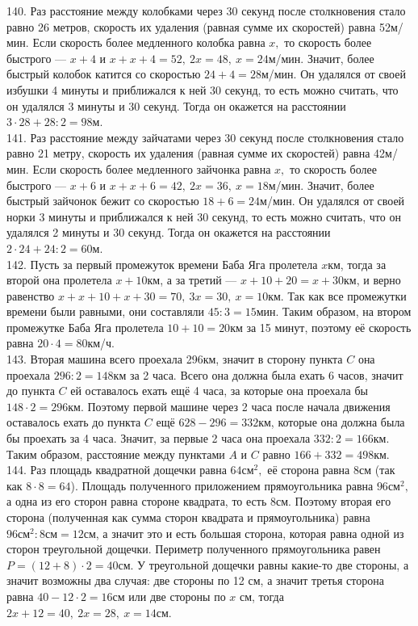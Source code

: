 140. Раз расстояние между колобками через 30 секунд после столкновения стало равно 26 метров, скорость их удаления (равная сумме их скоростей) равна 52м/мин. Если скорость более медленного колобка равна $x,$ то скорость более быстрого --- $x+4$ и $x+x+4=52,\ 2x=48,\ x=24$м/мин. Значит, более быстрый колобок катится со скоростью $24+4=28$м/мин. Он удалялся от своей избушки 4 минуты и приближался к ней 30 секунд, то есть можно считать, что он удалялся 3 минуты и 30 секунд. Тогда он окажется на расстоянии $3\cdot28+28:2=98$м.\\
141. Раз расстояние между зайчатами через 30 секунд после столкновения стало равно 21 метру, скорость их удаления (равная сумме их скоростей) равна 42м/мин. Если скорость более медленного зайчонка равна $x,$ то скорость более быстрого --- $x+6$ и $x+x+6=42,\ 2x=36,\ x=18$м/мин. Значит, более быстрый зайчонок бежит со скоростью $18+6=24$м/мин. Он удалялся от своей норки 3 минуты и приближался к ней 30 секунд, то есть можно считать, что он удалялся 2 минуты и 30 секунд. Тогда он окажется на расстоянии $2\cdot24+24:2=60$м.\\
142. Пусть за первый промежуток времени Баба Яга пролетела $x$км, тогда за второй она пролетела $x+10$км, а за третий --- $x+10+20=x+30$км, и верно равенство $x+x+10+x+30=70,\ 3x=30,\ x=10$км. Так как все промежутки времени были равными, они составляли $45:3=15$мин. Таким образом, на втором промежутке Баба Яга пролетела $10+10=20$км за 15 минут, поэтому её скорость равна $20\cdot4=80$км/ч.\\
143. Вторая машина всего проехала 296км, значит в сторону пункта $C$ она проехала $296:2=148$км за 2 часа. Всего она должна была ехать 6 часов, значит до пункта $C$ ей оставалось ехать ещё 4 часа, за которые она проехала бы $148\cdot2=296$км. Поэтому первой машине через 2 часа после начала движения оставалось ехать до пункта $C$ ещё $628-296=332$км, которые она должна была бы проехать за 4 часа. Значит, за первые 2 часа она проехала $332:2=166$км. Таким образом, расстояние между пунктами $A$ и $C$ равно $166+332=498$км.\\
144. Раз площадь квадратной дощечки равна $64\text{см}^2,$ её сторона равна 8см (так как $8\cdot8=64$). Площадь полученного приложением прямоугольника равна $96\text{см}^2,$ а одна из его сторон равна стороне квадрата, то есть 8см. Поэтому вторая его сторона (полученная как сумма сторон квадрата и прямоугольника) равна $96\text{см}^2:8\text{см}=12$см, а значит это и есть большая сторона, которая равна одной из сторон треугольной дощечки. Периметр полученного прямоугольника равен $P=(12+8)\cdot2=40$см. У треугольной дощечки равны какие-то две стороны, а значит возможны два случая: две стороны по 12 см, а значит третья сторона равна $40-12\cdot2=16$см или две стороны по $x$ см, тогда $2x+12=40,\ 2x=28,\ x=14$см.\\
